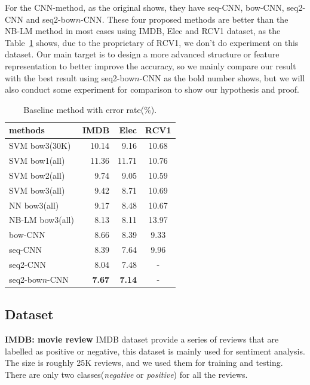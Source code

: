 For the CNN-method, as the original shows, they have seq-CNN, bow-CNN, seq2-CNN and seq2-bow$n$-CNN. These four proposed methods are
better than the NB-LM method in most cases using IMDB, Elec and RCV1 dataset, as the Table~\ref{baseline-table} shows, due to
the proprietary of RCV1, we don't do experiment on this dataset. Our main target is to design a more advanced structure or feature
representation to better improve the accuracy, so we mainly compare our result with the best result using seq2-bow$n$-CNN 
as the bold number shows, but we will also conduct some experiment for comparison to show our hypothesis and proof.


\begin{table}
\begin{center}
\begin{tabular}{|l|r|r|c|}
\hline \bf methods & \bf IMDB & \bf Elec & \bf RCV1 \\ \hline
SVM bow3(30K) & 10.14 & 9.16 & 10.68 \\
SVM bow1(all) & 11.36 & 11.71 & 10.76 \\
SVM bow2(all) & 9.74 & 9.05 & 10.59 \\
SVM bow3(all) & 9.42 & 8.71 & 10.69 \\
NN bow3(all) & 9.17 & 8.48 & 10.67 \\
NB-LM bow3(all) & 8.13 & 8.11 & 13.97 \\
\hline bow-CNN  & 8.66 & 8.39 & 9.33 \\
seq-CNN & 8.39 & 7.64 & 9.96 \\
seq2-CNN & 8.04 & 7.48 & - \\
seq2-bow$n$-CNN & \textbf{7.67} & \textbf{7.14} & - \\
\hline
\end{tabular}
\end{center}
\caption{\label{baseline-table} Baseline method with error rate(\%). }
\end{table}


\subsection{Dataset}

{\bf IMDB: movie review} IMDB dataset provide a series of reviews that are
labelled as positive or negative, this dataset is mainly used for sentiment
analysis. The size is roughly 25K reviews, and we used them for training
and testing. There are only two classes(\textit{negative} or \textit{positive})
for all the reviews.


